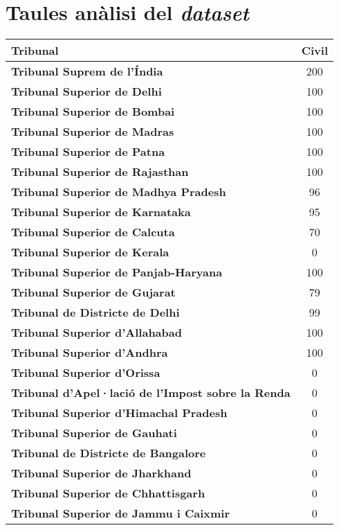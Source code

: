 \chapter{Taules anàlisi del \textit{dataset}}

\begin{table}[H]
    \centering
    \begin{tabular}{l|c}
      \toprule
      \textbf{Tribunal} & \textbf{Civil} \\
    \midrule
    \textbf{Tribunal Suprem de l'Índia} & 200 \\
    \textbf{Tribunal Superior de Delhi} & 100 \\
    \textbf{Tribunal Superior de Bombai} & 100 \\
    \textbf{Tribunal Superior de Madras} & 100 \\
    \textbf{Tribunal Superior de Patna} & 100 \\
    \textbf{Tribunal Superior de Rajasthan} & 100 \\
    \textbf{Tribunal Superior de Madhya Pradesh} & 96 \\
    \textbf{Tribunal Superior de Karnataka} & 95 \\
    \textbf{Tribunal Superior de Calcuta} & 70 \\
    \textbf{Tribunal Superior de Kerala} & 0 \\
    \textbf{Tribunal Superior de Panjab-Haryana} & 100 \\
    \textbf{Tribunal Superior de Gujarat} & 79 \\
    \textbf{Tribunal de Districte de Delhi} & 99 \\
    \textbf{Tribunal Superior d'Allahabad} & 100 \\
    \textbf{Tribunal Superior d'Andhra} & 100 \\
    \textbf{Tribunal Superior d'Orissa} & 0 \\
    \textbf{Tribunal d'Apel·lació de l'Impost sobre la Renda} & 0 \\
    \textbf{Tribunal Superior d'Himachal Pradesh} & 0 \\
    \textbf{Tribunal Superior de Gauhati} & 0 \\
    \textbf{Tribunal de Districte de Bangalore} & 0 \\
    \textbf{Tribunal Superior de Jharkhand} & 0 \\
    \textbf{Tribunal Superior de Chhattisgarh} & 0 \\
    \textbf{Tribunal Superior de Jammu i Caixmir} & 0 \\

\end{tabular}
\end{table}
